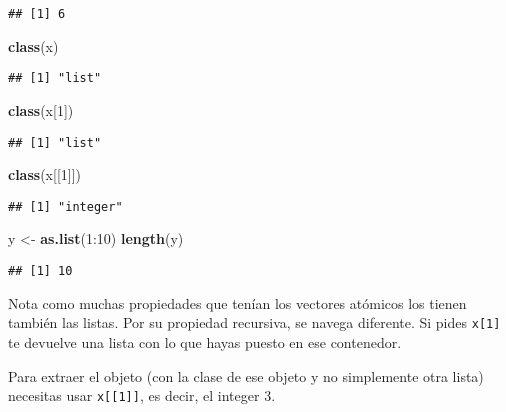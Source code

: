 \documentclass[]{article}
\newenvironment{Shaded}{\begin{snugshade}}{\end{snugshade}}
\newcommand{\KeywordTok}[1]{\textcolor[rgb]{0.13,0.29,0.53}{\textbf{{#1}}}}
\newcommand{\DecValTok}[1]{\textcolor[rgb]{0.00,0.00,0.81}{{#1}}}
\newcommand{\StringTok}[1]{\textcolor[rgb]{0.31,0.60,0.02}{{#1}}}
\newcommand{\NormalTok}[1]{{#1}}
\begin{document}
\begin{verbatim}
## [1] 6
\end{verbatim}

\begin{Shaded}
\begin{Highlighting}[]
\KeywordTok{class}\NormalTok{(x)}
\end{Highlighting}
\end{Shaded}

\begin{verbatim}
## [1] "list"
\end{verbatim}

\begin{Shaded}
\begin{Highlighting}[]
\KeywordTok{class}\NormalTok{(x[}\DecValTok{1}\NormalTok{])}
\end{Highlighting}
\end{Shaded}

\begin{verbatim}
## [1] "list"
\end{verbatim}

\begin{Shaded}
\begin{Highlighting}[]
\KeywordTok{class}\NormalTok{(x[[}\DecValTok{1}\NormalTok{]])}
\end{Highlighting}
\end{Shaded}

\begin{verbatim}
## [1] "integer"
\end{verbatim}

\begin{Shaded}
\begin{Highlighting}[]
\NormalTok{y <-}\StringTok{ }\KeywordTok{as.list}\NormalTok{(}\DecValTok{1}\NormalTok{:}\DecValTok{10}\NormalTok{)}
\KeywordTok{length}\NormalTok{(y)}
\end{Highlighting}
\end{Shaded}

\begin{verbatim}
## [1] 10
\end{verbatim}

Nota como muchas propiedades que tenían los vectores atómicos los tienen
también las listas. Por su propiedad recursiva, se navega diferente. Si
pides \texttt{x{[}1{]}} te devuelve una lista con lo que hayas puesto en
ese contenedor.

Para extraer el objeto (con la clase de ese objeto y no simplemente otra
lista) necesitas usar \texttt{x{[}{[}1{]}{]}}, es decir, el integer 3.
\end{document}
